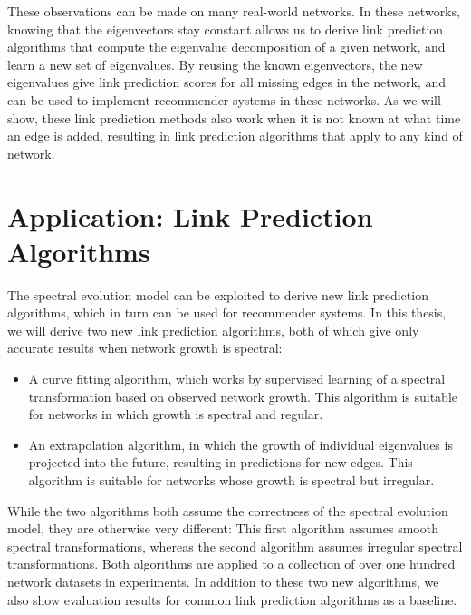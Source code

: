 \documentclass[11pt,a4paper]{book}
\begin{document}
These observations can be made on many real-world networks. 
In these
networks, knowing that the eigenvectors stay constant allows us to
derive link prediction algorithms that compute the eigenvalue
decomposition of a given network, and learn a new set of eigenvalues.
By reusing the known eigenvectors, the new eigenvalues give link
prediction scores for all missing edges in the network, and can be used
to implement recommender systems in these networks. 
As we will show, these link prediction methods also work when it is not
known at what time an edge is added, resulting in link prediction
algorithms that apply to any kind of network. 

\section{Application:  Link Prediction Algorithms}
The spectral evolution model can be exploited to derive new link
prediction algorithms, which in turn can be used for recommender
systems.  In this thesis, we will derive two new link prediction
algorithms, both of which give only accurate results when network growth
is spectral:
\begin{itemize}
  \item A curve fitting algorithm, which works by supervised learning of
    a spectral transformation based on observed network growth.  This
    algorithm is suitable for networks in which growth is spectral and
    regular. 
  \item An extrapolation algorithm, in which the growth of individual
    eigenvalues is projected into the future, resulting in predictions
    for new edges.  This algorithm is suitable for networks whose growth
    is spectral but irregular. 
\end{itemize}
While the two algorithms both assume the correctness of the spectral
evolution model, they are otherwise very different:  This first
algorithm assumes smooth spectral transformations, whereas the second
algorithm assumes irregular spectral transformations.  
Both algorithms are applied to a collection of over one hundred network
datasets in experiments.  In addition to these two new algorithms, we
also show evaluation results for common link prediction algorithms as a
baseline. 

\clearpage
\end{document}
